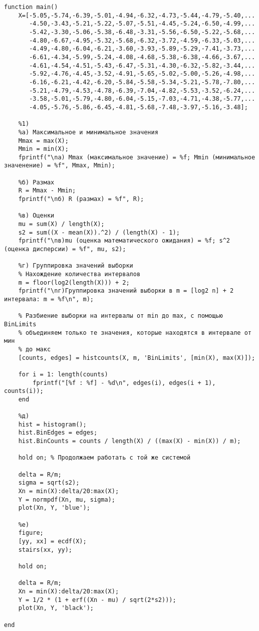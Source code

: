 \documentclass[a4paper,oneside,12pt]{extreport}
\theoremstyle{indented}
\begin{document}
\hfill 
\begin{lstlisting}[caption=Реализация]
function main()
    X=[-5.05,-5.74,-6.39,-5.01,-4.94,-6.32,-4.73,-5.44,-4.79,-5.40,...
       -4.50,-3.43,-5.21,-5.22,-5.07,-5.51,-4.45,-5.24,-6.50,-4.99,...
       -5.42,-3.30,-5.06,-5.38,-6.48,-3.31,-5.56,-6.50,-5.22,-5.68,...
       -4.80,-6.67,-4.95,-5.32,-5.68,-6.32,-3.72,-4.59,-6.33,-5.03,...
       -4.49,-4.80,-6.04,-6.21,-3.60,-3.93,-5.89,-5.29,-7.41,-3.73,...
       -6.61,-4.34,-5.99,-5.24,-4.08,-4.68,-5.38,-6.38,-4.66,-3.67,...
       -4.61,-4.54,-4.51,-5.43,-6.47,-5.31,-4.30,-6.32,-5.82,-3.44,...
       -5.92,-4.76,-4.45,-3.52,-4.91,-5.65,-5.02,-5.00,-5.26,-4.98,...
       -6.16,-6.21,-4.42,-6.20,-5.84,-5.58,-5.34,-5.21,-5.78,-7.80,...
       -5.21,-4.79,-4.53,-4.78,-6.39,-7.04,-4.82,-5.53,-3.52,-6.24,...
       -3.58,-5.01,-5.79,-4.80,-6.04,-5.15,-7.03,-4.71,-4.38,-5.77,...
       -4.05,-5.76,-5.86,-6.45,-4.81,-5.68,-7.48,-3.97,-5.16,-3.48];
    
    %1)
    %а) Максимальное и минимальное значения
    Mmax = max(X);
    Mmin = min(X);
    fprintf("\nа) Mmax (максимальное значение) = %f; Mmin (минимальное значенение) = %f", Mmax, Mmin);
    
    %б) Размах
    R = Mmax - Mmin;
    fprintf("\nб) R (размах) = %f", R);
    
    %в) Оценки
    mu = sum(X) / length(X);
    s2 = sum((X - mean(X)).^2) / (length(X) - 1);
    fprintf("\nв)mu (оценка математического ожидания) = %f; s^2 (оценка дисперсии) = %f", mu, s2);
    
    %г) Группировка значений выборки
    % Нахождение количества интервалов
    m = floor(log2(length(X))) + 2;
    fprintf("\nг)Группировка значений выборки в m = [log2 n] + 2 интервала: m = %f\n", m);
    
    % Разбиение выборки на интервалы от min до max, с помощью BinLimits
    % объединяем только те значения, которые находятся в интервале от мин
    % до макс
    [counts, edges] = histcounts(X, m, 'BinLimits', [min(X), max(X)]);
    
    for i = 1: length(counts)
        fprintf("[%f : %f] - %d\n", edges(i), edges(i + 1), counts(i));
    end
    
    %д) 
    hist = histogram();
    hist.BinEdges = edges;
    hist.BinCounts = counts / length(X) / ((max(X) - min(X)) / m);
    
    hold on; % Продолжаем работать с той же системой
    
    delta = R/m;
    sigma = sqrt(s2);
    Xn = min(X):delta/20:max(X);
    Y = normpdf(Xn, mu, sigma);
    plot(Xn, Y, 'blue');
    
    %е)
    figure;
    [yy, xx] = ecdf(X);
    stairs(xx, yy);
    
    hold on;
    
    delta = R/m;
    Xn = min(X):delta/20:max(X);
    Y = 1/2 * (1 + erf((Xn - mu) / sqrt(2*s2))); 
    plot(Xn, Y, 'black');
    
end
\end{lstlisting}
\end{document}
